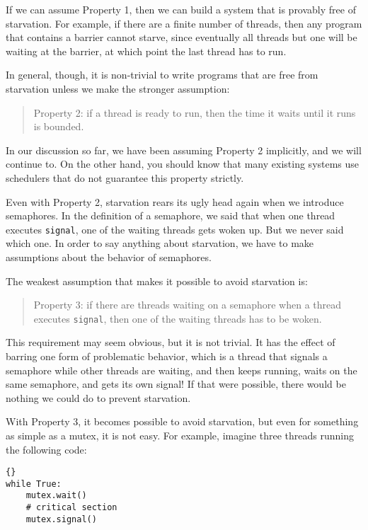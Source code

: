 \documentclass{book}
\begin{document}
If we can assume Property 1, then we can build a system
that is provably free of starvation.  For example, if there
are a finite number of threads, then any program that contains
a barrier cannot starve, since eventually all threads but one
will be waiting at the barrier, at which point the last thread
has to run.

In general, though, it is non-trivial to write programs that
are free from starvation unless we make the stronger
assumption:

\begin{quote}
Property 2: if a thread is ready to run, then the time it
waits until it runs is bounded.
\end{quote}

In our discussion so far, we have been assuming Property 2
implicitly, and we will continue to.  On the other hand,
you should know that many existing systems use schedulers
that do not guarantee this property strictly.

Even with Property 2, starvation rears its ugly head again
when we introduce semaphores.  In the definition of a semaphore,
we said that when one thread executes {\tt signal}, one of
the waiting threads gets woken up.  But we never said which one.
In order to say anything about starvation, we have to
make assumptions about the behavior of semaphores.

The weakest assumption that makes it possible to avoid
starvation is:

\begin{quote}
Property 3: if there are threads waiting on a semaphore when
a thread executes {\tt signal}, then one of the waiting threads
has to be woken.
\end{quote}

This requirement may seem obvious, but it is not trivial.  It has the
effect of barring one form of problematic behavior, which is a thread
that signals a semaphore while other threads are waiting, and then
keeps running, waits on the same semaphore, and gets its own signal!
If that were possible, there would be nothing we
could do to prevent starvation.

With Property 3, it becomes possible to avoid starvation, but
even for something as simple as a mutex, it is not easy.
For example, imagine three threads
running the following code:

\begin{lstlisting}[title={Mutex loop}]{}
while True:
    mutex.wait()
    # critical section 
    mutex.signal()
\end{lstlisting}
\end{document}
